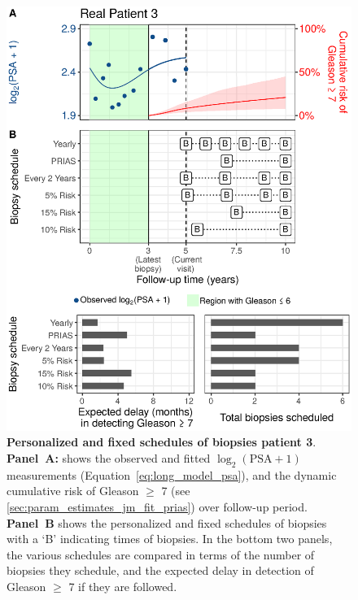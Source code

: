 \begin{figure}
\centerline{\includegraphics[width=\columnwidth]{images/demo_pat3_supp.eps}}
\caption{\textbf{Personalized and fixed schedules of biopsies patient 3}. \textbf{Panel~A:} shows the observed and fitted $\log_2(\mbox{PSA} + 1)$ measurements (Equation~\ref{eq:long_model_psa}), and the dynamic cumulative risk of Gleason $\geq$ 7 (see \ref{sec:param_estimates_jm_fit_prias}) over follow-up period. \textbf{Panel~B} shows the personalized and fixed schedules of biopsies with a `B' indicating times of biopsies. In the bottom two panels, the various schedules are compared in terms of the number of biopsies they schedule, and the expected delay in detection of Gleason $\geq$ 7 if they are followed.}
\label{fig:demo_pat3_supp}
\end{figure}

